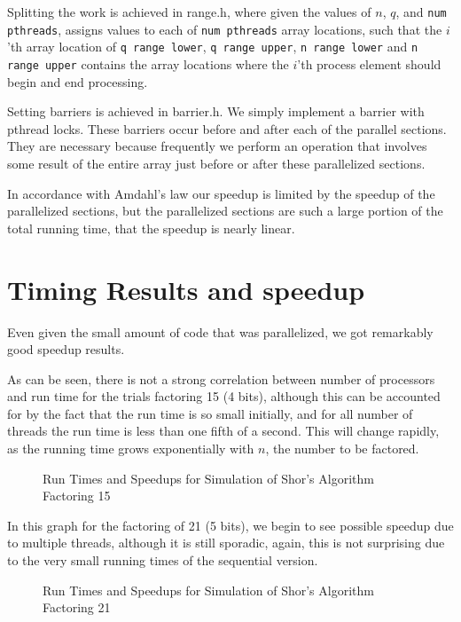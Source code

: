 \documentclass[]{article}
\begin{document}
Splitting the work is achieved in range.h, where given the values of
$n$, $q$, and \texttt{num pthreads}, assigns values to each of
\texttt{num pthreads} array locations, such that the $i$'th array location of
\texttt{q range lower}, \texttt{q range upper}, \texttt{n range lower} and
\texttt{n range upper} contains the array locations where the $i$'th 
process element should begin and end processing.

Setting barriers is achieved in barrier.h.  We simply implement a
barrier with pthread locks.  These barriers occur before and after
each of the parallel sections.  They are necessary because frequently
we perform an operation that involves some result of the entire array
just before or after these parallelized sections.

In accordance with Amdahl's law our speedup is limited by the speedup
of the parallelized sections, but the parallelized sections are such a
large portion of the total running time, that the speedup is nearly
linear.

\section{Timing Results and speedup}

Even given the small amount of code that was parallelized, we got
remarkably good speedup results.  

As can be seen, there is not a strong correlation between number of
processors and run time for the trials factoring 15 (4 bits), although
this can be accounted for by the fact that the run time is so small
initially, and for all number of threads the run time is less than one
fifth of a second.  This will change rapidly, as the running time
grows exponentially with $n$, the number to be factored.

\begin{figure}[ht]
\caption{Run Times and Speedups for Simulation of Shor's Algorithm Factoring 15}
\end{figure}

In this graph for the factoring of 21 (5 bits), we begin to see
possible speedup due to multiple threads, although it is still
sporadic, again, this is not surprising due to the very small running
times of the sequential version.

\begin{figure}[ht]
\caption{Run Times and Speedups for Simulation of Shor's Algorithm Factoring 21}
\end{figure}
\end{document}
